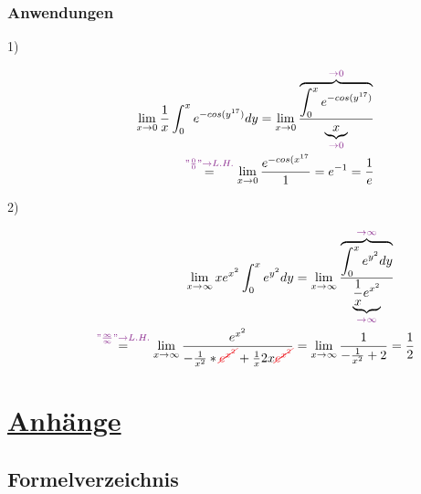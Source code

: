 \documentclass[12pt,a4paper]{article}%
\numberwithin{equation}{section}
\def\colBord#1{\begingroup\color{Fuchsia}{#1}\endgroup}
\def\colRed#1{\begingroup\color{Red}{#1}\endgroup}
\begin{document}
\subsubsection{Anwendungen}
\begin{description}
\item[1)]
\begin{align}
\lim_{x\to 0} \frac{1}{x} \int_0^x e^{-cos(y^{17})} dy = \lim_{x\to 0}  \frac{\overbrace{\int_0^x e^{-cos(y^{17})}}^{\colBord{\rightarrow 0}}}{\underbrace{x}_{\colBord{\rightarrow 0}}} \nonumber\\
\overset{\colBord{"\frac{0}{0}" \rightarrow L.H.}}{=}
\lim_{x \to 0} \frac{e^{-cos(x^{17}}}{1} = e^{-1} = \frac{1}{e}
\end{align}
\item[2)]
\begin{align}
\lim_{x \to \infty} xe^{x^2} \int_0^x e^{y^2}dy 
&= \lim_{x \to \infty} \frac{\overbrace{\int_0^x e^{y^2}dy}^{\colBord{\rightarrow \infty}}}
{\underbrace{\frac{1}{x} e^{x^2}}_{\colBord{\rightarrow \infty}}} \nonumber\\
\overset{\colBord{"\frac{\infty}{\infty}" \rightarrow L.H.}}{=}
\lim_{x \to \infty} \frac{e^{x^2}}{-\frac{1}{x^2}* \colRed{\cancel{e^{x^2}}}
+ \frac{1}{x} 2x \colRed{\cancel{e^{x^2}}}} 
&= \lim_{x \to \infty} \frac{1}{- \frac{1}{x^2} +2} = \frac{1}{2}
\end{align}
\end{description}

\newpage
\section{\underline{Anhänge}}
\subsection{Formelverzeichnis}



\end{document}
